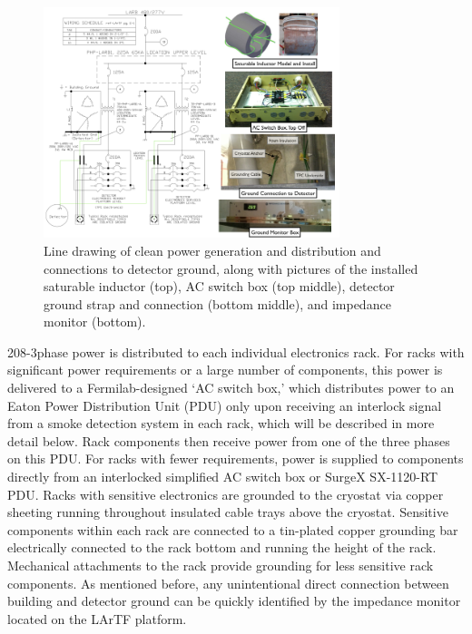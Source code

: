 \begin{figure}[htb!pb]
\centering
\includegraphics[width=0.77\textwidth]{./figures/PowerDiagPic.png}
\caption[]{Line drawing of clean power generation and distribution and connections to detector ground, along with pictures of the installed saturable inductor (top), AC switch box (top middle), detector ground strap and connection (bottom middle), and impedance monitor (bottom).}
\label{fig:ElecInfAC}
\end{figure}


208-3phase power is distributed to each individual electronics rack.  For racks with significant power requirements or a large number of components, this power is delivered to a Fermilab-designed `AC switch box,' which distributes power to an Eaton Power Distribution Unit (PDU) only upon receiving an interlock signal from a smoke detection system in each rack, which will be described in more detail below.  Rack components then receive power from one of the three phases on this PDU.  For racks with fewer requirements, power is supplied to components directly from an interlocked simplified AC switch box or SurgeX SX-1120-RT PDU.  Racks with sensitive electronics are grounded to the cryostat via copper sheeting running throughout insulated cable trays above the cryostat.  Sensitive components within each rack are connected to a tin-plated copper grounding bar electrically connected to the rack bottom and running the height of the rack.  Mechanical attachments to the rack provide grounding for less sensitive rack components.  As mentioned before, any unintentional direct connection between building and detector ground can be quickly identified by the impedance monitor located on the LArTF platform.



